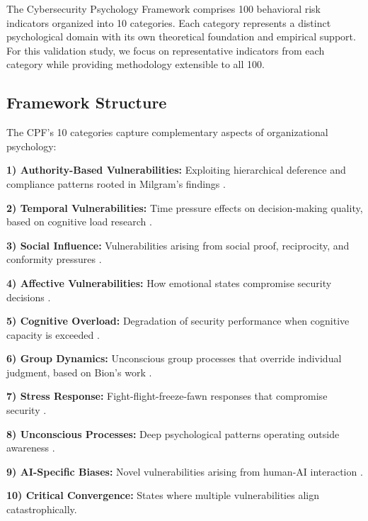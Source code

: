 \documentclass[10pt,twocolumn]{IEEEtran}
\begin{document}
The Cybersecurity Psychology Framework comprises 100 behavioral risk indicators organized into 10 categories. Each category represents a distinct psychological domain with its own theoretical foundation and empirical support. For this validation study, we focus on representative indicators from each category while providing methodology extensible to all 100.

\subsection{Framework Structure}

The CPF's 10 categories capture complementary aspects of organizational psychology:

\textbf{1) Authority-Based Vulnerabilities:} Exploiting hierarchical deference and compliance patterns rooted in Milgram's findings \cite{milgram1974}.

\textbf{2) Temporal Vulnerabilities:} Time pressure effects on decision-making quality, based on cognitive load research \cite{kahneman2011}.

\textbf{3) Social Influence:} Vulnerabilities arising from social proof, reciprocity, and conformity pressures \cite{cialdini2007}.

\textbf{4) Affective Vulnerabilities:} How emotional states compromise security decisions \cite{damasio1994}.

\textbf{5) Cognitive Overload:} Degradation of security performance when cognitive capacity is exceeded \cite{miller1956}.

\textbf{6) Group Dynamics:} Unconscious group processes that override individual judgment, based on Bion's work \cite{bion1961}.

\textbf{7) Stress Response:} Fight-flight-freeze-fawn responses that compromise security \cite{selye1956}.

\textbf{8) Unconscious Processes:} Deep psychological patterns operating outside awareness \cite{jung1969}.

\textbf{9) AI-Specific Biases:} Novel vulnerabilities arising from human-AI interaction \cite{brundage2024}.

\textbf{10) Critical Convergence:} States where multiple vulnerabilities align catastrophically.
\end{document}
